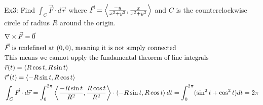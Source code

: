 \documentclass[11pt, fleqn]{article}
\begin{document}
Ex3: Find $\int_C\vec{F}\cdot d\vec{r}$ where $\vec{F}=\left\langle \frac{-y}{x^2+y^2},\frac{x}{x^2+y^2} \right\rangle$ and $C$ is the counterclockwise circle of radius $R$ around the origin.
\begin{align*}
    &\nabla\times\vec{F}=\vec{0}\\
    &\text{$\vec{F}$ is undefined at $(0,0)$, meaning it is not simply connected}\\
    &\text{This means we cannot apply the fundamental theorem of line integrals}\\
    &\vec{r}(t)=\left\langle R\cos t,R\sin t \right\rangle\\
    &\vec{r}'(t)=\left\langle -R\sin t,R\cos t \right\rangle\\
    &\int_C\vec{F}\cdot d\vec{r}=\int_0^{2\pi}\left\langle \frac{-R\sin t}{R^2},\frac{R\cos t}{R^2} \right\rangle\cdot\left\langle -R\sin t,R\cos t \right\rangle dt=\int_0^{2\pi}(\sin^2t+\cos^2t)dt=2\pi
\end{align*}
\end{document}
